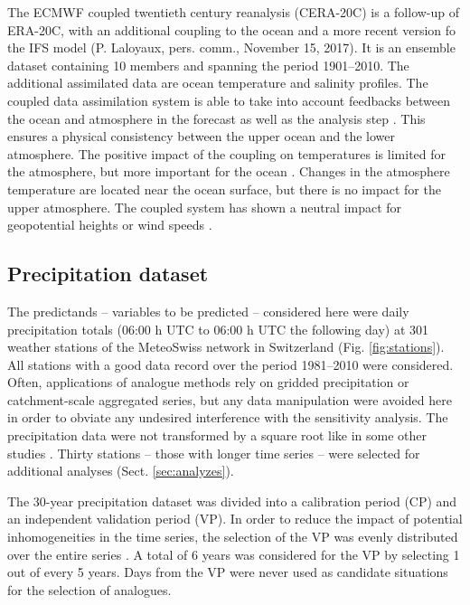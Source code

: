 \documentclass{ametsoc}
\begin{document}
The ECMWF coupled twentieth century reanalysis (CERA-20C) is a follow-up of ERA-20C, with an additional coupling to the ocean and a more recent version fo the IFS model (P. Laloyaux, pers. comm., November 15, 2017). It is an ensemble dataset containing 10 members and spanning the period 1901--2010. The additional assimilated data are ocean temperature and salinity profiles. The coupled data assimilation system is able to take into account feedbacks between the ocean and atmosphere in the forecast as well as the analysis step \citep{Laloyaux2016}. This ensures a physical consistency between the upper ocean and the lower atmosphere. The positive impact of the coupling on temperatures is limited for the atmosphere, but more important for the ocean \citep{Laloyaux2016}. Changes in the atmosphere temperature are located near the ocean surface, but there is no impact for the upper atmosphere. The coupled system has shown a neutral impact for geopotential heights or wind speeds \citep{Laloyaux2016}.



\subsection{Precipitation dataset}
\label{sec:precip}

The predictands -- variables to be predicted -- considered here were daily precipitation totals (06:00 h UTC to 06:00 h UTC the following day) at 301 weather stations of the MeteoSwiss network in Switzerland (Fig. \ref{fig:stations}). All stations with a good data record over the period 1981--2010 were considered. Often, applications of analogue methods rely on gridded precipitation or catchment-scale aggregated series, but any data manipulation were avoided here in order to obviate any undesired interference with the sensitivity analysis. The precipitation data were not transformed by a square root like in some other studies \cite[see e.g.][]{Bontron2004}. Thirty stations -- those with longer time series -- were selected for additional analyses (Sect. \ref{sec:analyzes}).

The 30-year precipitation dataset was divided into a calibration period (CP) and an independent validation period (VP). In order to reduce the impact of potential inhomogeneities in the time series, the selection of the VP was evenly distributed over the entire series \citep[as in][]{BenDaoud2010}. A total of 6 years was considered for the VP by selecting 1 out of every 5 years. Days from the VP were never used as candidate situations for the selection of analogues.
\end{document}
